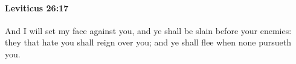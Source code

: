 
		\paragraph{Leviticus 26:17} %
			\label{LEVITICUS-26-17}

			And I will set my face against you, and ye shall be slain before your enemies: they that hate you shall reign over you; and ye shall flee when none pursueth you.


